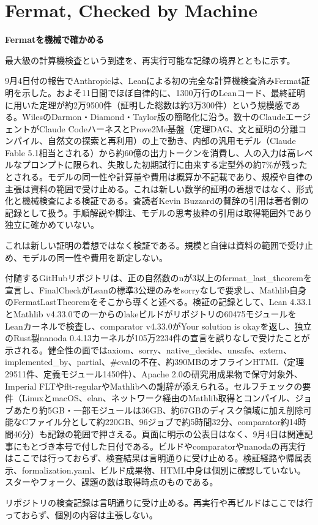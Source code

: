 \section{Fermat, Checked by Machine}
\begin{wideflow}
{\Large\bfseries Fermatを機械で確かめる}\par
\smallskip
{\color{SurveyMuted}最大級の計算機検査という到達を、再実行可能な記録の境界とともに示す。}\par
\end{wideflow}

9月4日付の報告でAnthropicは、Leanによる初の完全な計算機検査済みFermat証明を示した\cite{fermatscience}。およそ11日間でほぼ自律的に、1300万行のLeanコード、最終証明に用いた定理が約2万9500件（証明した総数は約3万300件）という規模感である。WilesのDarmon・Diamond・Taylor版の簡略化に沿う。数十のClaudeエージェントがClaude CodeハーネスとProve2Me基盤（定理DAG、文と証明の分離コンパイル、自然文の探索と再利用）の上で動き、内部の汎用モデル（Claude Fable 5.1相当とされる）から約60億の出力トークンを消費し、人の入力は高レベルなプロンプトに限られ、失敗した初期試行に由来する定型外の約7\%が残ったとされる。モデルの同一性や計算量や費用は概算か不記載であり、規模や自律の主張は資料の範囲で受け止める。これは新しい数学的証明の着想ではなく、形式化と機械検査による検証である。査読者Kevin Buzzardの賛辞の引用は著者側の記録として扱う。手順解説や脚注、モデルの思考抜粋の引用は取得範囲外であり独立に確かめていない。

\begin{claimboundary}[検証と着想の境界]
これは新しい証明の着想ではなく検証である。規模と自律は資料の範囲で受け止め、モデルの同一性や費用を断定しない。
\end{claimboundary}

付随するGitHubリポジトリは、正の自然数のnが3以上のfermat\_last\_theoremを宣言し、FinalCheckがLeanの標準3公理のみをsorryなしで要求し、Mathlib自身のFermatLastTheoremをそこから導くと述べる\cite{fermatgithub}。検証の記録として、Lean 4.33.1とMathlib v4.33.0での一からのlakeビルドがリポジトリの60475モジュールをLeanカーネルで検査し、comparator v4.33.0がYour solution is okayを返し、独立のRust製nanoda 0.4.13カーネルが105万2234件の宣言を誤りなしで受けたことが示される。健全性の面ではaxiom、sorry、native\_decide、unsafe、extern、implemented\_by、partial、\#evalの不在、約390MBのオフラインHTML（定理29511件、定義モジュール1450件）、Apache 2.0の研究用成果物で保守対象外、Imperial FLTやflt-regularやMathlibへの謝辞が添えられる。セルフチェックの要件（LinuxとmacOS、elan、ネットワーク経由のMathlib取得とコンパイル、ジョブあたり約5GB・一部モジュールは36GB、約67GBのディスク領域に加え削除可能なCファイル分として約220GB、96ジョブで約5時間32分、comparator約14時間46分）も記録の範囲で押さえる。頁面に明示の公表日はなく、9月4日は関連記事にもとづき本号で付した日付である。ビルドやcomparatorやnanodaの再実行はここでは行っておらず、検査結果は言明通りに受け止める。検証経路や帰属表示、formalization.yaml、ビルド成果物、HTML中身は個別に確認していない。スターやフォーク、課題の数は取得時点のものである。

\begin{technicalnote}[再実行の境界]
リポジトリの検査記録は言明通りに受け止める。再実行や再ビルドはここでは行っておらず、個別の内容は主張しない\cite{fermatgithub}。
\end{technicalnote}
